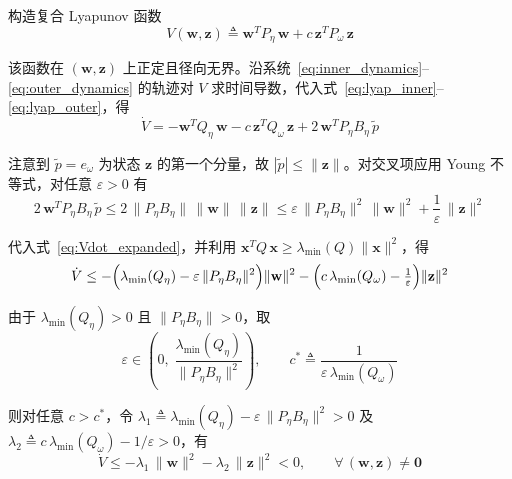 构造复合 Lyapunov 函数
\begin{equation}
    V(\mathbf{w},\mathbf{z}) \triangleq \mathbf{w}^T P_\eta\,\mathbf{w} + c\,\mathbf{z}^T P_\omega\,\mathbf{z}
    \label{eq:lyap_composite}
\end{equation}

该函数在 $(\mathbf{w},\mathbf{z})$ 上正定且径向无界。沿系统~\eqref{eq:inner_dynamics}--\eqref{eq:outer_dynamics} 的轨迹对 $V$ 求时间导数，代入式~\eqref{eq:lyap_inner}--\eqref{eq:lyap_outer}，得
\begin{equation}
    \dot{V} = -\mathbf{w}^T Q_\eta\,\mathbf{w} - c\,\mathbf{z}^T Q_\omega\,\mathbf{z} + 2\,\mathbf{w}^T P_\eta B_\eta\,\tilde{p}
    \label{eq:Vdot_expanded}
\end{equation}

注意到 $\tilde{p} = e_\omega$ 为状态 $\mathbf{z}$ 的第一个分量，故 $|\tilde{p}| \leq \|\mathbf{z}\|$。对交叉项应用 Young 不等式，对任意 $\varepsilon > 0$ 有
\begin{equation}
    2\,\mathbf{w}^T P_\eta B_\eta\,\tilde{p}
    \leq 2\,\|P_\eta B_\eta\|\,\|\mathbf{w}\|\,\|\mathbf{z}\|
    \leq \varepsilon\,\|P_\eta B_\eta\|^2\,\|\mathbf{w}\|^2 + \frac{1}{\varepsilon}\,\|\mathbf{z}\|^2
\end{equation}

代入式~\eqref{eq:Vdot_expanded}，并利用 $\mathbf{x}^T Q\,\mathbf{x} \geq \lambda_{\min}(Q)\|\mathbf{x}\|^2$，得
\begin{equation}
    \dot{V} \leq
    -\Bigl(\lambda_{\min}(Q_\eta) - \varepsilon\,\|P_\eta B_\eta\|^2\Bigr)\|\mathbf{w}\|^2
    -\Bigl(c\,\lambda_{\min}(Q_\omega) - \tfrac{1}{\varepsilon}\Bigr)\|\mathbf{z}\|^2
\end{equation}

由于 $\lambda_{\min}(Q_\eta) > 0$ 且 $\|P_\eta B_\eta\| > 0$，取
\begin{equation}
    \varepsilon \in \left(0,\;\frac{\lambda_{\min}(Q_\eta)}{\|P_\eta B_\eta\|^2}\right),\qquad
    c^* \triangleq \frac{1}{\varepsilon\,\lambda_{\min}(Q_\omega)}
    \label{eq:param_choice}
\end{equation}

则对任意 $c > c^*$，令 $\lambda_1 \triangleq \lambda_{\min}(Q_\eta) - \varepsilon\,\|P_\eta B_\eta\|^2 > 0$ 及 $\lambda_2 \triangleq c\,\lambda_{\min}(Q_\omega) - 1/\varepsilon > 0$，有
\begin{equation}
    \dot{V} \leq -\lambda_1\,\|\mathbf{w}\|^2 - \lambda_2\,\|\mathbf{z}\|^2 < 0,\qquad \forall\,(\mathbf{w},\mathbf{z}) \neq \mathbf{0}
\end{equation}

